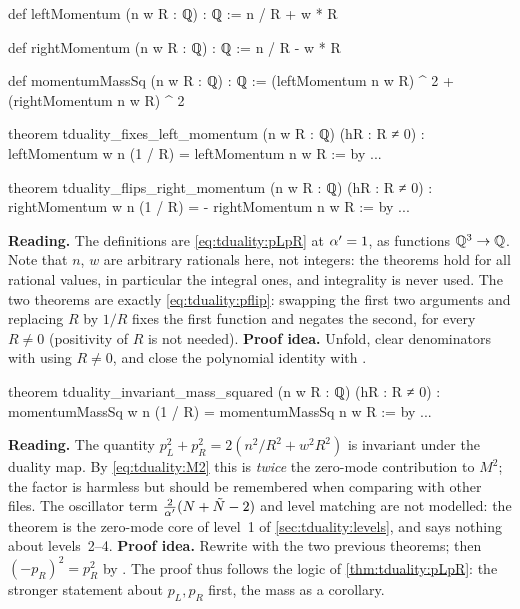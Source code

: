 \begin{leanbox}
\begin{leancode}
def leftMomentum (n w R : ℚ) : ℚ := n / R + w * R

def rightMomentum (n w R : ℚ) : ℚ := n / R - w * R

def momentumMassSq (n w R : ℚ) : ℚ :=
  (leftMomentum n w R) ^ 2 + (rightMomentum n w R) ^ 2

theorem tduality_fixes_left_momentum (n w R : ℚ) (hR : R ≠ 0) :
    leftMomentum w n (1 / R) = leftMomentum n w R := by ...

theorem tduality_flips_right_momentum (n w R : ℚ) (hR : R ≠ 0) :
    rightMomentum w n (1 / R) = - rightMomentum n w R := by ...
\end{leancode}
\textbf{Reading.} The definitions are \eqref{eq:tduality:pLpR} at $\alpha'=1$, as functions
$\mathbb{Q}^3\to\mathbb{Q}$. Note that $n$, $w$ are arbitrary rationals here, not integers: the theorems hold for
all rational values, in particular the integral ones, and integrality is never used. The two
theorems are exactly \eqref{eq:tduality:pflip}: swapping the first two arguments and
replacing $R$ by $1/R$ fixes the first function and negates the second, for every $R\ne0$
(positivity of $R$ is not needed). \textbf{Proof idea.} Unfold, clear denominators with
 using $R\ne0$, and close the polynomial identity with .
\end{leanbox}

\begin{leanbox}
\begin{leancode}
theorem tduality_invariant_mass_squared (n w R : ℚ) (hR : R ≠ 0) :
    momentumMassSq w n (1 / R) = momentumMassSq n w R := by ...
\end{leancode}
\textbf{Reading.} The quantity $p_L^2+p_R^2=2(n^2/R^2+w^2R^2)$ is invariant under the duality
map. By \eqref{eq:tduality:M2} this is \emph{twice} the zero-mode contribution to $M^2$; the
factor is harmless but should be remembered when comparing with other files. The oscillator
term $\frac2{\alpha'}(N+\tilde N-2)$ and level matching are not modelled: the theorem is the
zero-mode core of level~1 of \cref{sec:tduality:levels}, and says nothing about levels~2--4.
\textbf{Proof idea.} Rewrite with the two previous theorems; then $(-p_R)^2=p_R^2$ by
. The proof thus follows the logic of \cref{thm:tduality:pLpR}: the stronger
statement about $p_L,p_R$ first, the mass as a corollary.
\end{leanbox}

